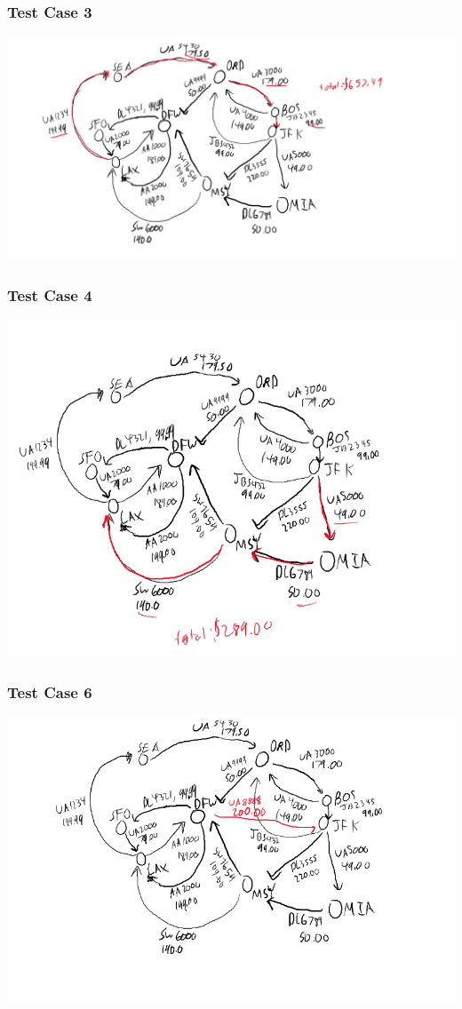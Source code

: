 \documentclass[titlepage]{article}
\begin{document}
\subsubsection{Test Case 3}
\includegraphics[scale=0.4]{testCase2.png}
\subsubsection{Test Case 4}
\includegraphics[scale=0.4]{testCase3.png}
\subsubsection{Test Case 6}
\includegraphics[scale=0.4]{testCase5.png}
\end{document}
